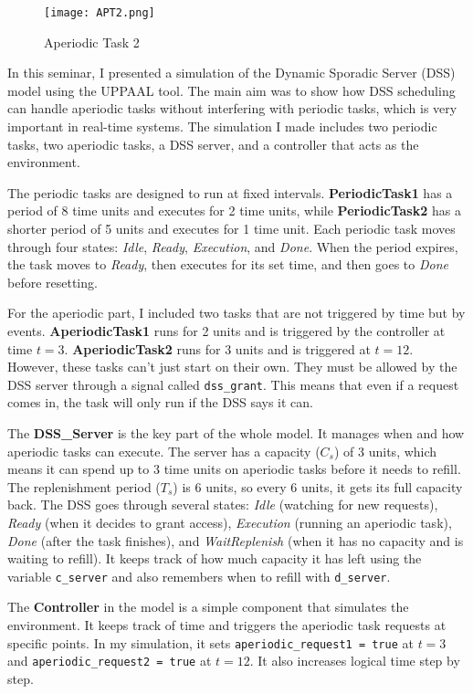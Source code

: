 \documentclass[conference]{IEEEtran}
\begin{document}
            \begin{figure}
    \centering
    \texttt{[image: APT2.png]}
    \caption{Aperiodic Task 2}
    \label{fig:enter-label}
\end{figure}
In this seminar, I presented a simulation of the Dynamic Sporadic Server (DSS) model using the UPPAAL tool. The main aim was to show how DSS scheduling can handle aperiodic tasks without interfering with periodic tasks, which is very important in real-time systems. The simulation I made includes two periodic tasks, two aperiodic tasks, a DSS server, and a controller that acts as the environment.

The periodic tasks are designed to run at fixed intervals. \textbf{PeriodicTask1} has a period of 8 time units and executes for 2 time units, while \textbf{PeriodicTask2} has a shorter period of 5 units and executes for 1 time unit. Each periodic task moves through four states: \textit{Idle}, \textit{Ready}, \textit{Execution}, and \textit{Done}. When the period expires, the task moves to \textit{Ready}, then executes for its set time, and then goes to \textit{Done} before resetting.


For the aperiodic part, I included two tasks that are not triggered by time but by events. \textbf{AperiodicTask1} runs for 2 units and is triggered by the controller at time $t = 3$. \textbf{AperiodicTask2} runs for 3 units and is triggered at $t = 12$. However, these tasks can’t just start on their own. They must be allowed by the DSS server through a signal called \texttt{dss\_grant}. This means that even if a request comes in, the task will only run if the DSS says it can.

The \textbf{DSS\_Server} is the key part of the whole model. It manages when and how aperiodic tasks can execute. The server has a capacity ($C_s$) of 3 units, which means it can spend up to 3 time units on aperiodic tasks before it needs to refill. The replenishment period ($T_s$) is 6 units, so every 6 units, it gets its full capacity back. The DSS goes through several states: \textit{Idle} (watching for new requests), \textit{Ready} (when it decides to grant access), \textit{Execution} (running an aperiodic task), \textit{Done} (after the task finishes), and \textit{WaitReplenish} (when it has no capacity and is waiting to refill). It keeps track of how much capacity it has left using the variable \texttt{c\_server} and also remembers when to refill with \texttt{d\_server}.

The \textbf{Controller} in the model is a simple component that simulates the environment. It keeps track of time and triggers the aperiodic task requests at specific points. In my simulation, it sets \texttt{aperiodic\_request1 = true} at $t = 3$ and \texttt{aperiodic\_request2 = true} at $t = 12$. It also increases logical time step by step.
\end{document}
